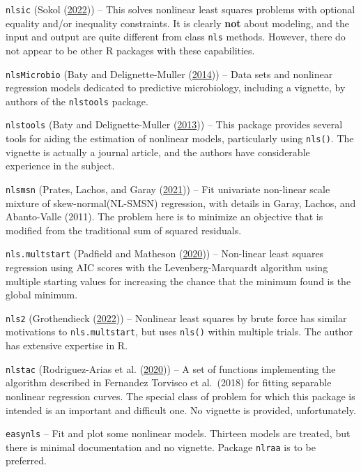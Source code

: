 \documentclass[
]{article}
\begin{document}
\texttt{nlsic} (Sokol (\protect\hyperlink{ref-nlsic-manual}{2022})) --
This solves nonlinear least squares problems with optional equality
and/or inequality constraints. It is clearly \textbf{not} about
modeling, and the input and output are quite different from class
\texttt{nls} methods. However, there do not appear to be other R
packages with these capabilities.

\texttt{nlsMicrobio} (Baty and Delignette-Muller
(\protect\hyperlink{ref-nlsMicrobio-manual}{2014})) -- Data sets and
nonlinear regression models dedicated to predictive microbiology,
including a vignette, by authors of the \texttt{nlstools} package.

\texttt{nlstools} (Baty and Delignette-Muller
(\protect\hyperlink{ref-p-nlstools}{2013})) -- This package provides
several tools for aiding the estimation of nonlinear models,
particularly using \texttt{nls()}. The vignette is actually a journal
article, and the authors have considerable experience in the subject.

\texttt{nlsmsn} (Prates, Lachos, and Garay
(\protect\hyperlink{ref-m-nlsmsn}{2021})) -- Fit univariate non-linear
scale mixture of skew-normal(NL-SMSN) regression, with details in Garay,
Lachos, and Abanto-Valle (2011). The problem here is to minimize an
objective that is modified from the traditional sum of squared
residuals.

\texttt{nls.multstart} (Padfield and Matheson
(\protect\hyperlink{ref-nlsmultstart}{2020})) -- Non-linear least
squares regression using AIC scores with the Levenberg-Marquardt
algorithm using multiple starting values for increasing the chance that
the minimum found is the global minimum.

\texttt{nls2} (Grothendieck (\protect\hyperlink{ref-nls2-22}{2022})) --
Nonlinear least squares by brute force has similar motivations to
\texttt{nls.multstart}, but uses \texttt{nls()} within multiple trials.
The author has extensive expertise in R.

\texttt{nlstac} (Rodriguez-Arias et al.
(\protect\hyperlink{ref-m-nlstac}{2020})) -- A set of functions
implementing the algorithm described in Fernandez Torvisco et al.~(2018)
for fitting separable nonlinear regression curves. The special class of
problem for which this package is intended is an important and difficult
one. No vignette is provided, unfortunately.

\texttt{easynls} -- Fit and plot some nonlinear models. Thirteen models
are treated, but there is minimal documentation and no vignette. Package
\texttt{nlraa} is to be preferred.
\end{document}
